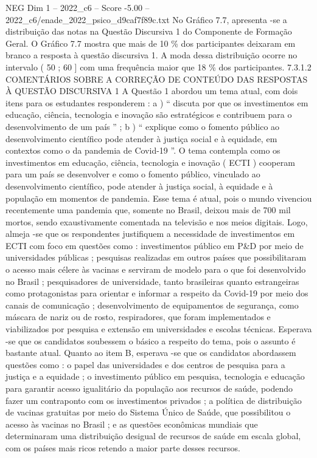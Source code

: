 \begin{textsample}{NEG Dim 1 – 2022\_c6 – Score -5.00 – 2022\_c6/enade\_2022\_psico\_d9caf7f89c.txt}
No Gráfico 7.7, apresenta -se a distribuição das notas na Questão Discursiva 1 do Componente de Formação Geral.
O Gráfico 7.7 mostra que mais de 10 \% dos participantes deixaram em branco a resposta à questão discursiva 1.
A moda dessa distribuição ocorre no intervalo ( 50 ; 60 ] com uma frequência maior que 18 \% dos participantes. 7.3.1.2 COMENTÁRIOS SOBRE A CORREÇÃO DE CONTEÚDO DAS RESPOSTAS À QUESTÃO DISCURSIVA 1 A Questão 1 abordou um tema atual, com dois itens para os estudantes responderem : a ) “ discuta por que os investimentos em educação, ciência, tecnologia e inovação são estratégicos e contribuem para o desenvolvimento de um país ” ; b ) “ explique como o fomento público ao desenvolvimento científico pode atender à justiça social e à equidade, em contextos como o da pandemia de Covid-19 ”.
O tema contempla como os investimentos em educação, ciência, tecnologia e inovação ( ECTI ) cooperam para um país se desenvolver e como o fomento público, vinculado ao desenvolvimento científico, pode atender à justiça social, à equidade e à população em momentos de pandemia.
Esse tema é atual, pois o mundo vivenciou recentemente uma pandemia que, somente no Brasil, deixou mais de 700 mil mortos, sendo exaustivamente comentada na televisão e nos meios digitais.
Logo, almeja -se que os respondentes justifiquem a necessidade de investimentos em ECTI com foco em questões como : investimentos público em P\&D por meio de universidades públicas ; pesquisas realizadas em outros países que possibilitaram o acesso mais célere às vacinas e serviram de modelo para o que foi desenvolvido no Brasil ; pesquisadores de universidade, tanto brasileiras quanto estrangeiras como protagonistas para orientar e informar a respeito da Covid-19 por meio dos canais de comunicação ; desenvolvimento de equipamentos de segurança, como máscara de nariz ou de rosto, respiradores, que foram implementados e viabilizados por pesquisa e extensão em universidades e escolas técnicas.
Esperava -se que os candidatos soubessem o básico a respeito do tema, pois o assunto é bastante atual.
Quanto ao item B, esperava -se que os candidatos abordassem questões como : o papel das universidades e dos centros de pesquisa para a justiça e a equidade ; o investimento público em pesquisa, tecnologia e educação para garantir acesso igualitário da população aos recursos de saúde, podendo fazer um contraponto com os investimentos privados ; a política de distribuição de vacinas gratuitas por meio do Sistema Único de Saúde, que possibilitou o acesso às vacinas no Brasil ; e as questões econômicas mundiais que determinaram uma distribuição desigual de recursos de saúde em escala global, com os países mais ricos retendo a maior parte desses recursos.

\end{textsample}

